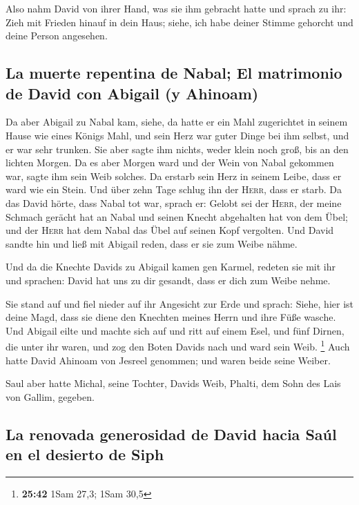  Also nahm David von ihrer Hand, was sie ihm gebracht
hatte und sprach zu ihr: Zieh mit Frieden hinauf in dein Haus; siehe,
ich habe deiner Stimme gehorcht und deine Person angesehen.

\hypertarget{la-muerte-repentina-de-nabal-el-matrimonio-de-david-con-abigail-y-ahinoam}{%
\subsection{La muerte repentina de Nabal; El matrimonio de David con
Abigail (y
Ahinoam)}\label{la-muerte-repentina-de-nabal-el-matrimonio-de-david-con-abigail-y-ahinoam}}

 Da aber Abigail zu Nabal kam, siehe, da hatte er ein
Mahl zugerichtet in seinem Hause wie eines Königs Mahl, und sein Herz
war guter Dinge bei ihm selbst, und er war sehr trunken. Sie aber sagte
ihm nichts, weder klein noch groß, bis an den lichten Morgen.
 Da es aber Morgen ward und der Wein von Nabal gekommen
war, sagte ihm sein Weib solches. Da erstarb sein Herz in seinem Leibe,
dass er ward wie ein Stein.  Und über zehn Tage schlug
ihn der \textsc{Herr}, dass er starb.  Da das David
hörte, dass Nabal tot war, sprach er: Gelobt sei der \textsc{Herr}, der
meine Schmach gerächt hat an Nabal und seinen Knecht abgehalten hat von
dem Übel; und der \textsc{Herr} hat dem Nabal das Übel auf seinen Kopf
vergolten. Und David sandte hin und ließ mit Abigail reden, dass er sie
zum Weibe nähme.

 Und da die Knechte Davids zu Abigail kamen gen Karmel,
redeten sie mit ihr und sprachen: David hat uns zu dir gesandt, dass er
dich zum Weibe nehme.

 Sie stand auf und fiel nieder auf ihr Angesicht zur Erde
und sprach: Siehe, hier ist deine Magd, dass sie diene den Knechten
meines Herrn und ihre Füße wasche.  Und Abigail eilte und
machte sich auf und ritt auf einem Esel, und fünf Dirnen, die unter ihr
waren, und zog den Boten Davids nach und ward sein Weib. \footnote{\textbf{25:42}
  1Sam 27,3; 1Sam 30,5}  Auch hatte David Ahinoam von
Jesreel genommen; und waren beide seine Weiber.

 Saul aber hatte Michal, seine Tochter, Davids Weib,
Phalti, dem Sohn des Lais von Gallim, gegeben.

\hypertarget{la-renovada-generosidad-de-david-hacia-sauxfal-en-el-desierto-de-siph}{%
\subsection{La renovada generosidad de David hacia Saúl en el desierto
de
Siph}\label{la-renovada-generosidad-de-david-hacia-sauxfal-en-el-desierto-de-siph}}

